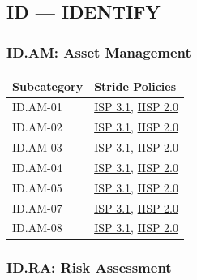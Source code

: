 \documentclass[11pt,landscape]{article}
\begin{document}
\subsection{ID --- IDENTIFY}

\subsubsection{ID.AM: Asset Management}

\begin{tabularx}{\textwidth}{|p{3.5cm}|X|}
\hline
\rowcolor{headgray} \textbf{Subcategory} & \textbf{Stride Policies} \\
\hline
ID.AM-01 & \hyperref[pol:ISP31]{ISP 3.1}, \hyperref[pol:IISP20]{IISP 2.0} \\
\hline
ID.AM-02 & \hyperref[pol:ISP31]{ISP 3.1}, \hyperref[pol:IISP20]{IISP 2.0} \\
\hline
ID.AM-03 & \hyperref[pol:ISP31]{ISP 3.1}, \hyperref[pol:IISP20]{IISP 2.0} \\
\hline
ID.AM-04 & \hyperref[pol:ISP31]{ISP 3.1}, \hyperref[pol:IISP20]{IISP 2.0} \\
\hline
ID.AM-05 & \hyperref[pol:ISP31]{ISP 3.1}, \hyperref[pol:IISP20]{IISP 2.0} \\
\hline
ID.AM-07 & \hyperref[pol:ISP31]{ISP 3.1}, \hyperref[pol:IISP20]{IISP 2.0} \\
\hline
ID.AM-08 & \hyperref[pol:ISP31]{ISP 3.1}, \hyperref[pol:IISP20]{IISP 2.0} \\
\hline
\end{tabularx}

\subsubsection{ID.RA: Risk Assessment}
\end{document}
